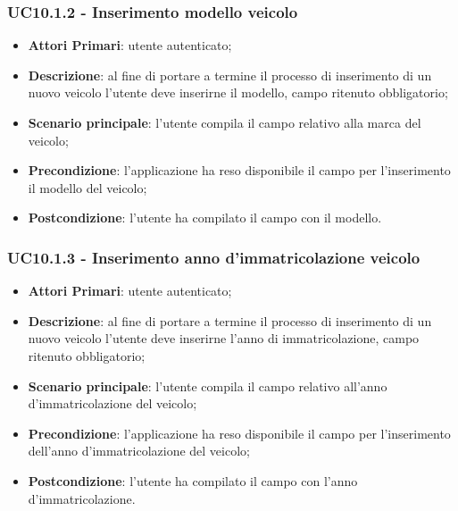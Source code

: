 \subsubsection{UC10.1.2 - Inserimento modello veicolo}
\begin{itemize}
	\item \textbf{Attori Primari}: utente autenticato;
	\item \textbf{Descrizione}: al fine di portare a termine il processo di inserimento di un nuovo veicolo l'utente deve inserirne il modello, campo ritenuto obbligatorio;
	\item \textbf{Scenario principale}: l'utente compila il campo relativo alla marca del veicolo;	
	\item \textbf{Precondizione}: l'applicazione ha reso disponibile il campo per l'inserimento il modello del veicolo;
	\item \textbf{Postcondizione}: l'utente ha compilato il campo con il modello.	
\end{itemize}

\subsubsection{UC10.1.3 - Inserimento anno d'immatricolazione veicolo}
\begin{itemize}
	\item \textbf{Attori Primari}: utente autenticato;
	\item \textbf{Descrizione}: al fine di portare a termine il processo di inserimento di un nuovo veicolo l'utente deve inserirne l'anno di immatricolazione, campo ritenuto obbligatorio;
	\item \textbf{Scenario principale}: l'utente compila il campo relativo all'anno d'immatricolazione del veicolo;	
	\item \textbf{Precondizione}: l'applicazione ha reso disponibile il campo per l'inserimento dell'anno d'immatricolazione del veicolo;
	\item \textbf{Postcondizione}: l'utente ha compilato il campo con l'anno d'immatricolazione.	
\end{itemize}

